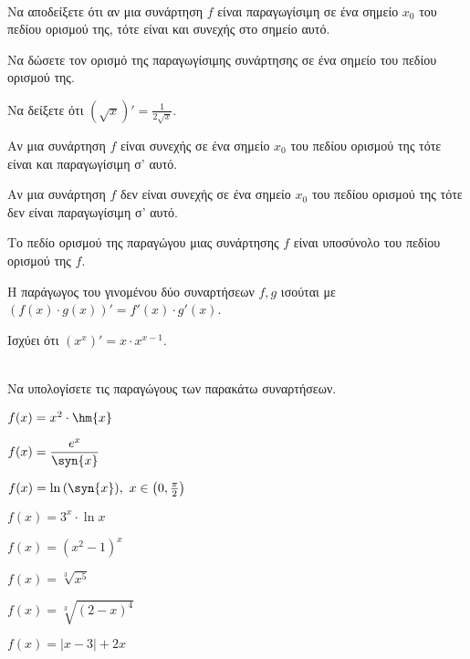 \documentclass[twoside,nofonts,ektypwsh]{frontisthrio-diag}
\begin{document}
\begin{thema}
\item\mbox{}\\
\vspace{-7mm}
\begin{erwthma}
\item Να αποδείξετε ότι αν μια συνάρτηση $ f $ είναι παραγωγίσιμη σε ένα σημείο $ x_0 $ του πεδίου ορισμού της, τότε είναι και συνεχής στο σημείο αυτό.
\item Να δώσετε τον ορισμό της παραγωγίσιμης συνάρτησης σε ένα σημείο του πεδίου ορισμού της.\\
\item Να δείξετε ότι $ (\sqrt{x})'=\frac{1}{2\sqrt{x}} $.
\item \swstolathospan
\begin{alist}
\item Αν μια συνάρτηση $ f $ είναι συνεχής σε ένα σημείο $ x_0 $ του πεδίου ορισμού της τότε είναι και παραγωγίσιμη σ' αυτό.
\item Αν μια συνάρτηση $ f $ δεν είναι συνεχής σε ένα σημείο $ x_0 $ του πεδίου ορισμού της τότε δεν είναι παραγωγίσιμη σ' αυτό.
\item Το πεδίο ορισμού της παραγώγου μιας συνάρτησης $ f $ είναι υποσύνολο του πεδίου ορισμού της $ f $.
\item Η παράγωγος του γινομένου δύο συναρτήσεων $ f,g $ ισούται με $ (f(x)\cdot g(x))'=f'(x)\cdot g'(x) $.
\item Ισχύει ότι $ \left(x^x\right)'=x\cdot x^{x-1} $.
\end{alist}
\end{erwthma}
\item\mbox{}\\
Να υπολογίσετε τις παραγώγους των παρακάτω συναρτήσεων.
\begin{multicols}{2}
\begin{erwthma}
\item $ f(x)=x^2\cdot\hm{x} $
\item $ f(x)=\dfrac{e^x}{\syn{x}} $
\item $ f(x)=\ln{(\syn{x})},\ x\in\left(0,\frac{\pi}{2} \right)  $
\item $ f(x)=3^x\cdot\ln{x} $
\item $ f(x)=(x^2-1)^x $
\item $ f(x)=\sqrt[3]{x^5} $
\item $ f(x)=\sqrt[3]{(2-x)^4}  $
\item $ f(x)=|x-3|+2x $

\end{erwthma}
\end{multicols}
\end{thema}
\end{document}
